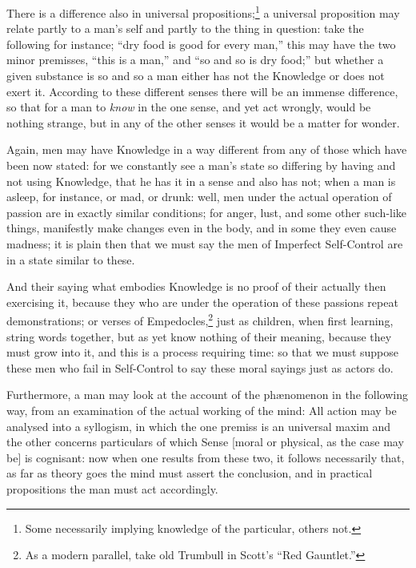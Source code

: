 There is a difference also in universal
propositions;\footnote{Some necessarily implying knowledge of the particular, others not.}
a universal proposition may relate partly to a man’s self and partly to
the thing in question: take the following for instance; “dry food is good
for every man,” this may have the two minor premisses, “this is a
man,” and “so and so is dry food;” but whether a given
substance is so and so a man either has not the Knowledge or does not exert it.
According to these different senses there will be an immense difference, so
that for a man to \emph{know} in the one sense, and yet act wrongly, would be
nothing strange, but in any of the other senses it would be a matter for
wonder.

Again, men may have Knowledge in a way different from any of those which have
been now stated: for we constantly see a man’s state so differing by
having and not using Knowledge, that he has it in a sense and also has not;
when a man is asleep, for instance, or mad, or drunk: well, men under the
actual operation of passion are in exactly similar conditions; for anger, lust,
and some other such-like things, manifestly make changes even in the body, and
in some they even cause madness; it is plain then that we must say the men of
Imperfect Self-Control are in a state similar to these.

And their saying what embodies Knowledge is no proof of their actually then
exercising it, because they who are under the operation of these passions
repeat demonstrations; or verses of
Empedocles,\footnote{As a modern parallel, take old Trumbull in Scott’s “Red
Gauntlet.”}
just as children, when first learning, string words together, but as yet know
nothing of their meaning, because they must grow into it, and this is a process
requiring time: so that we must suppose these men who fail in Self-Control to
say these moral sayings just as actors do.

Furthermore, a man may look at the account of the phænomenon in the following
way, from an examination of the actual working of the mind: All action may be
analysed into a syllogism, in which the one premiss is an universal maxim and
the other concerns particulars of which Sense [moral or physical, as the case
may be] is cognisant: now when one results from these two, it follows
necessarily that, as far as theory goes the mind must assert the conclusion,
and in practical propositions the man must act accordingly.

